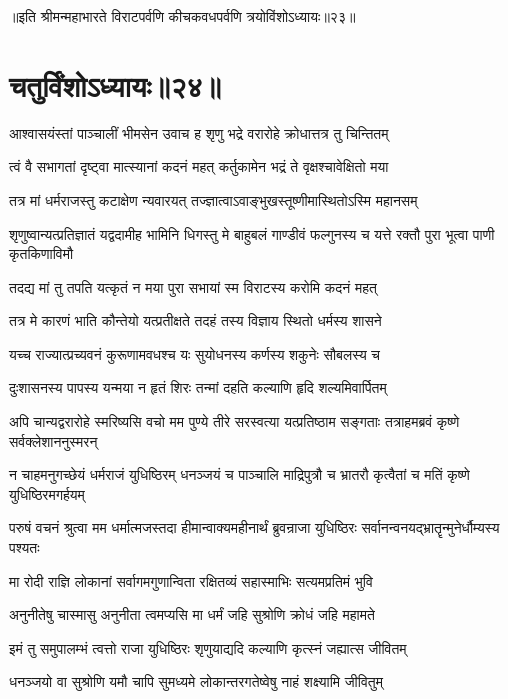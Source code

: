 ॥इति श्रीमन्महाभारते विराटपर्वणि कीचकवधपर्वणि त्रयोविंशोऽध्यायः॥२३॥

\chapter{चतुर्विंशोऽध्यायः॥२४॥}

\twolineshloka
{आश्वासयंस्तां पाञ्चालीं भीमसेन उवाच ह}
{शृणु भद्रे वरारोहे क्रोधात्तत्र तु चिन्तितम्}


\twolineshloka
{त्वं वै सभागतां दृष्ट्वा मात्स्यानां कदनं महत्}
{कर्तुकामेन भद्रं ते वृक्षश्चावेक्षितो मया}


\twolineshloka
{तत्र मां धर्मराजस्तु कटाक्षेण न्यवारयत्}
{तज्ज्ञात्वाऽवाङ्भुखस्तूष्णीमास्थितोऽस्मि महानसम्}


\threelineshloka
{शृणुष्वान्यत्प्रतिज्ञातं यद्वदामीह भामिनि}
{धिगस्तु मे बाहुबलं गाण्डीवं फल्गुनस्य च}
{यत्ते रक्तौ पुरा भूत्वा पाणी कृतकिणाविमौ}


\twolineshloka
{तदद्य मां तु तपति यत्कृतं न मया पुरा}
{सभायां स्म विराटस्य करोमि कदनं महत्}


\twolineshloka
{तत्र मे कारणं भाति कौन्तेयो यत्प्रतीक्षते}
{तदहं तस्य विज्ञाय स्थितो धर्मस्य शासने}


\twolineshloka
{यच्च राज्यात्प्रच्यवनं कुरूणामवधश्च यः}
{सुयोधनस्य कर्णस्य शकुनेः सौबलस्य च}


\twolineshloka
{दुःशासनस्य पापस्य यन्मया न हृतं शिरः}
{तन्मां दहति कल्याणि हृदि शल्यमिवार्पितम्}


\threelineshloka
{अपि चान्यद्वरारोहे स्मरिष्यसि वचो मम}
{पुण्ये तीरे सरस्वत्या यत्प्रतिष्ठाम सङ्गताः}
{तत्राहमब्रवं कृष्णे सर्वक्लेशाननुस्मरन्}


\threelineshloka
{न चाहमनुगच्छेयं धर्मराजं युधिष्ठिरम्}
{धनञ्जयं च पाञ्चालि माद्रिपुत्रौ च भ्रातरौ}
{कृत्वैतां च मतिं कृष्णे युधिष्ठिरमगर्हयम्}


\threelineshloka
{परुषं वचनं श्रुत्वा मम धर्मात्मजस्तदा}
{हीमान्वाक्यमहीनार्थं ब्रुवन्राजा युधिष्ठिरः}
{सर्वानन्वनयद्भ्रातॄन्मुनेर्धौम्यस्य पश्यतः}


\twolineshloka
{मा रोदी राज्ञि लोकानां सर्वागमगुणान्विता}
{रक्षितव्यं सहास्माभिः सत्यमप्रतिमं भुवि}


\twolineshloka
{अनुनीतेषु चास्मासु अनुनीता त्वमप्यसि}
{मा धर्मं जहि सुश्रोणि क्रोधं जहि महामते}


\twolineshloka
{इमं तु समुपालम्भं त्वत्तो राजा युधिष्ठिरः}
{शृणुयाद्यदि कल्याणि कृत्स्नं जह्यात्स जीवितम्}


\twolineshloka
{धनञ्जयो वा सुश्रोणि यमौ चापि सुमध्यमे}
{लोकान्तरगतेष्वेषु नाहं शक्ष्यामि जीवितुम्}


